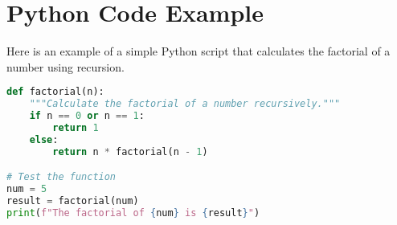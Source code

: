 \documentclass{article}
\begin{document}
\section*{Python Code Example}

Here is an example of a simple Python script that calculates the factorial of a number using recursion.

\begin{lstlisting}[language=Python, caption=Factorial Function in Python]
def factorial(n):
    """Calculate the factorial of a number recursively."""
    if n == 0 or n == 1:
        return 1
    else:
        return n * factorial(n - 1)

# Test the function
num = 5
result = factorial(num)
print(f"The factorial of {num} is {result}")
\end{lstlisting}
\end{document}
